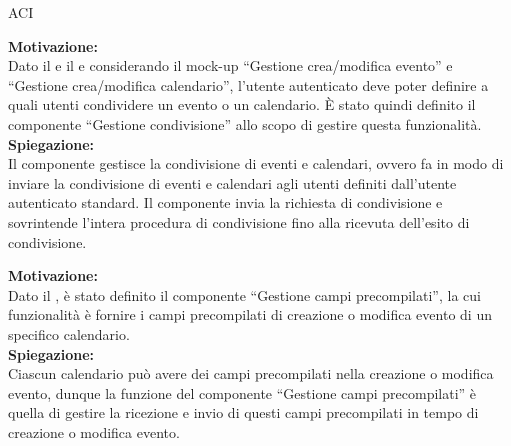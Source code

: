 \begin{listaPersonale}{ACI}

    \textbf{Motivazione:}\\
    Dato il  e il  e considerando il mock-up  “Gestione crea/modifica evento” e  “Gestione crea/modifica calendario”, l'utente autenticato deve poter definire a quali utenti condividere un evento o un calendario. È stato quindi definito il componente “Gestione condivisione” allo scopo di gestire questa funzionalità. \\
    \textbf{Spiegazione:} \\Il componente gestisce la condivisione di eventi e calendari, ovvero fa in modo di inviare la condivisione di eventi e calendari agli utenti definiti dall'utente autenticato standard. Il componente invia la richiesta di condivisione e sovrintende l'intera procedura di condivisione fino alla ricevuta dell'esito di condivisione.



    \textbf{Motivazione:}\\
    Dato il , è stato definito il componente “Gestione campi precompilati”, la cui funzionalità è fornire i campi precompilati di creazione o modifica evento di un specifico calendario.\\
    \textbf{Spiegazione:} \\Ciascun calendario può avere dei campi precompilati nella creazione o modifica evento, dunque la funzione del componente “Gestione campi precompilati” è quella di gestire la ricezione e invio di questi campi precompilati in tempo di creazione o modifica evento.




\end{listaPersonale}
